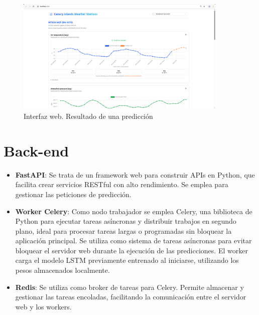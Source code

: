 \begin{figure}[H]
    \centering
    \includegraphics[width=0.9\textwidth]{images/frontend_prediction_6.png}
    \caption{Interfaz web. Resultado de una predicción}
    \label{frontend_prediction}
\end{figure}


\section{Back-end}

\begin{itemize}
    \item \textbf{FastAPI}: Se trata de un framework web para construir APIs en Python, que facilita crear servicios RESTful con alto rendimiento. Se emplea para gestionar las peticiones de predicción.
    \item \textbf{Worker Celery}: Como nodo trabajador se emplea Celery, una biblioteca de Python para ejecutar tareas asíncronas y distribuir trabajos en segundo plano, ideal para procesar tareas largas o programadas sin bloquear la aplicación principal. 
    Se utiliza como sistema de tareas asíncronas para evitar bloquear el servidor web durante la ejecución de las predicciones. El worker carga el modelo LSTM previamente entrenado al iniciarse, utilizando los pesos almacenados localmente. 
    \item \textbf{Redis}: Se utiliza como broker de tareas para Celery. Permite almacenar y gestionar las tareas encoladas, facilitando la comunicación entre el servidor web y los workers.
\end{itemize}

